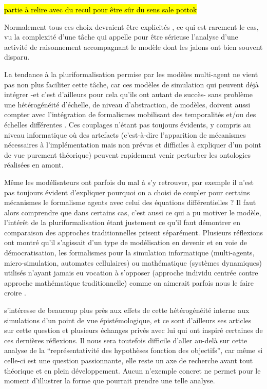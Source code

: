  \hl{partie à relire avec du recul pour être sûr du sens sale pottok}

Normalement tous ces choix devraient être explicités \autocite{Varenne2013b}, ce qui est rarement le cas, vu la complexité d'une tâche qui appelle pour être sérieuse l'analyse d'une activité de raisonnement accompagnant le modèle dont les jalons ont bien souvent disparu.

La tendance à la pluriformalisation  permise par les modèles multi-agent ne vient pas non plus faciliter cette tâche, car ces modèles de simulation qui peuvent déjà intégrer -et c'est d'ailleurs pour cela qu'ils ont autant de succès- sans problème une hétérogénéité d'échelle, de niveau d'abstraction, de modèles, doivent aussi compter avec l'intégration de formalismes mobilisant des temporalités et/ou des échelles différentes \autocites{Varenne2008,Varenne2012a}. Ces couplages n'étant pas toujours évidents, y compris au niveau informatique où des artefacts (c'est-à-dire l'apparition de mécanismes nécessaires à l'implémentation mais non prévus et difficiles à expliquer d'un point de vue purement théorique) peuvent rapidement venir perturber les ontologies réalisées en amont.

Même les modélisateurs ont parfois du mal à s'y retrouver, par exemple il n'est pas toujours évident d'expliquer pourquoi on a choisi de coupler pour certains mécanismes le formalisme agents avec celui des équations différentielles ? Il faut alors comprendre que dans certains cas, c'est aussi ce qui a pu motiver le modèle, l'intérêt de la pluriformalisation étant justement ce qu'il faut démontrer en comparaison des approches traditionnelles prisent séparément. Plusieurs réflexions ont montré qu'il s'agissait d'un type de modélisation en devenir et en voie de démocratisation, les formalismes pour la simulation informatique (multi-agents, micro-simulation, automates cellulaires) ou mathématique (systèmes dynamiques) utilisés n'ayant jamais eu vocation à s'opposer (approche individu centrée contre approche mathématique traditionnelle) comme on aimerait parfois nous le faire croire \autocites{Sanders2013, Banos2013}.

\textcite{Varenne2013b} s’intéresse de beaucoup plus près aux effets de cette hétérogénéité interne aux simulations d’un point de vue épistémologique, et ce sont d'ailleurs ses articles sur cette question et plusieurs échanges privés avec lui qui ont inspiré certaines de ces dernières réflexions. Il nous sera toutefois difficile d’aller au-delà sur cette analyse de la \enquote{représentativité des hypothèses fonction des objectifs}, car même si celle-ci est une question passionnante, elle reste un axe de recherche avant tout théorique et en plein développement. Aucun n'exemple concret ne permet pour le moment d'illustrer la forme que pourrait prendre une telle analyse.

